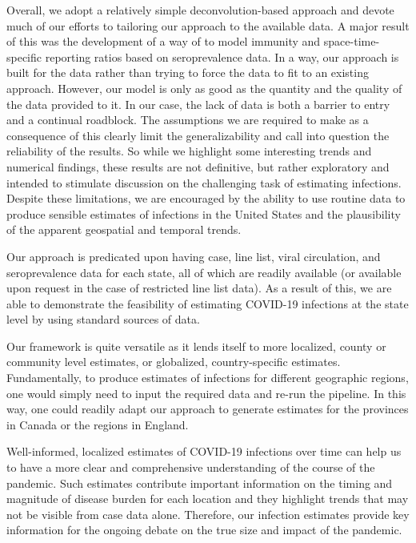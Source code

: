 \documentclass{article}
\begin{document}
Overall, we adopt a relatively simple deconvolution-based approach and devote
much of our efforts to tailoring our approach to the available data. A
major result of this was the development of a way of to model immunity and
space-time-specific reporting ratios based on seroprevalence data.
In a way, our approach is built for the data rather than trying to force the data to fit
to an existing approach. However, our model is only as good as the quantity and 
the quality of the data provided to it. In our case, the lack of data is both a barrier to entry
and a continual roadblock. The assumptions we are required to make as a
consequence of this clearly limit the generalizability and call into question
the reliability of the results. So while we highlight some interesting trends and
numerical findings, these results are not definitive, but rather exploratory and
intended to stimulate discussion on the challenging task of estimating
infections. Despite these limitations, we are encouraged by the ability to use
routine data to produce sensible estimates of infections in the United States and the
plausibility of the apparent geospatial and temporal trends. 
 
Our approach is predicated upon having case, line list, viral circulation, and
seroprevalence data for each state, all of which are readily available (or
available upon request in the case of restricted line list data). As a result of
this, we are able to demonstrate the feasibility of estimating COVID-19
infections at the state level by using standard sources of data. 

Our framework is quite versatile as it lends itself to more localized, county or
community level estimates, or globalized, country-specific estimates.
Fundamentally, to produce estimates of infections for different geographic
regions, one would simply need to input the required data and re-run the
pipeline. In this way, one could readily adapt our approach to generate
estimates for the provinces in Canada or the regions in England.

Well-informed, localized estimates of COVID-19 infections over time can help us
to have a more clear and comprehensive understanding of the course of the
pandemic. Such estimates contribute important information on the timing and
magnitude of disease burden for each location and they highlight trends that may
not be visible from case data alone. Therefore, our infection estimates provide
key information for the ongoing debate on the true size and impact of the
pandemic.
\end{document}
